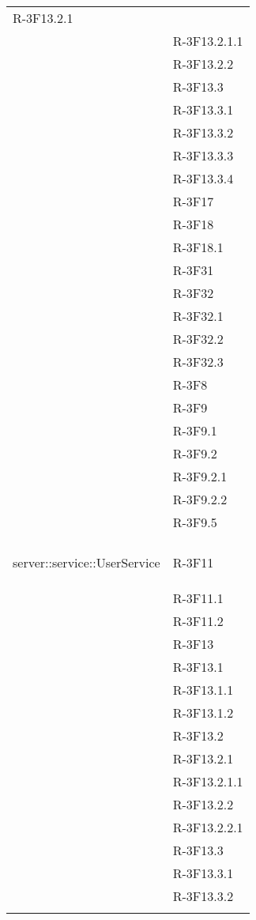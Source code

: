 \begin{longtable}{l p{3cm}}
R-3F13.2.1 \tabularnewline &

R-3F13.2.1.1 \tabularnewline &

R-3F13.2.2 \tabularnewline &

R-3F13.3 \tabularnewline &

R-3F13.3.1 \tabularnewline &

R-3F13.3.2 \tabularnewline &

R-3F13.3.3 \tabularnewline &

R-3F13.3.4 \tabularnewline &

R-3F17 \tabularnewline &

R-3F18 \tabularnewline &

R-3F18.1 \tabularnewline &

R-3F31 \tabularnewline &

R-3F32 \tabularnewline &

R-3F32.1 \tabularnewline &

R-3F32.2 \tabularnewline &

R-3F32.3 \tabularnewline &

R-3F8 \tabularnewline &

R-3F9 \tabularnewline &

R-3F9.1 \tabularnewline &

R-3F9.2 \tabularnewline &

R-3F9.2.1 \tabularnewline &

R-3F9.2.2 \tabularnewline &

R-3F9.5 \tabularnewline &\tabularnewline
\midrule
\hypertarget{server::service::UserService}{server::service::UserService} & R-3F11 \tabularnewline &

R-3F11.1 \tabularnewline &

R-3F11.2 \tabularnewline &

R-3F13 \tabularnewline &

R-3F13.1 \tabularnewline &

R-3F13.1.1 \tabularnewline &

R-3F13.1.2 \tabularnewline &

R-3F13.2 \tabularnewline &

R-3F13.2.1 \tabularnewline &

R-3F13.2.1.1 \tabularnewline &

R-3F13.2.2 \tabularnewline &

R-3F13.2.2.1 \tabularnewline &

R-3F13.3 \tabularnewline &

R-3F13.3.1 \tabularnewline &

R-3F13.3.2 \tabularnewline &


\end{longtable}
